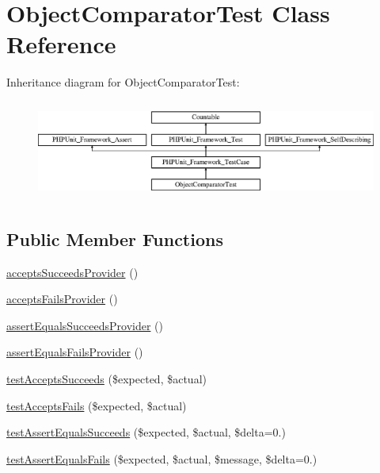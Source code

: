 \hypertarget{class_sebastian_bergmann_1_1_comparator_1_1_object_comparator_test}{}\section{Object\+Comparator\+Test Class Reference}
\label{class_sebastian_bergmann_1_1_comparator_1_1_object_comparator_test}
Inheritance diagram for Object\+Comparator\+Test\+:\begin{figure}[H]
\begin{center}
\leavevmode
\includegraphics[height=3.303835cm]{class_sebastian_bergmann_1_1_comparator_1_1_object_comparator_test}
\end{center}
\end{figure}
\subsection*{Public Member Functions}
\begin{DoxyCompactItemize}
\item 
\mbox{\hyperlink{class_sebastian_bergmann_1_1_comparator_1_1_object_comparator_test_a2ca71e8095ac10e058cd9d7a68da8608}{accepts\+Succeeds\+Provider}} ()
\item 
\mbox{\hyperlink{class_sebastian_bergmann_1_1_comparator_1_1_object_comparator_test_a9ea19e26cacbca06356c2f229079f8a1}{accepts\+Fails\+Provider}} ()
\item 
\mbox{\hyperlink{class_sebastian_bergmann_1_1_comparator_1_1_object_comparator_test_acb6bc1b6e9d32990bdd287f8b590a5fa}{assert\+Equals\+Succeeds\+Provider}} ()
\item 
\mbox{\hyperlink{class_sebastian_bergmann_1_1_comparator_1_1_object_comparator_test_a3cc10e39239b6e3f3fda1d34c0fb1c14}{assert\+Equals\+Fails\+Provider}} ()
\item 
\mbox{\hyperlink{class_sebastian_bergmann_1_1_comparator_1_1_object_comparator_test_a907ea73398b22f4a8cf37728cfc981e3}{test\+Accepts\+Succeeds}} (\$expected, \$actual)
\item 
\mbox{\hyperlink{class_sebastian_bergmann_1_1_comparator_1_1_object_comparator_test_afe5eff1a1b7049f973a035117a7e0df1}{test\+Accepts\+Fails}} (\$expected, \$actual)
\item 
\mbox{\hyperlink{class_sebastian_bergmann_1_1_comparator_1_1_object_comparator_test_aad90dcf32f0451135282025c43fb9661}{test\+Assert\+Equals\+Succeeds}} (\$expected, \$actual, \$delta=0.)
\item 
\mbox{\hyperlink{class_sebastian_bergmann_1_1_comparator_1_1_object_comparator_test_aaad96b55030caa2544741f25464f9756}{test\+Assert\+Equals\+Fails}} (\$expected, \$actual, \$message, \$delta=0.)
\end{DoxyCompactItemize}
